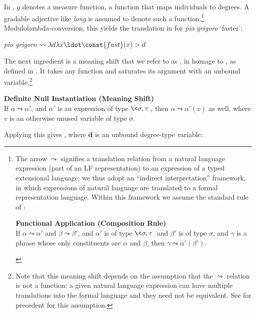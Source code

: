 \documentclass[output=paper
,modfonts
,nonflat]{langsci/langscibook}
\begin{document}
In , $g$ denotes a measure function, a function that maps individuals to degrees. A gradable adjective like \textit{long} is assumed to denote such a function.\footnote{The arrow $\leadsto$ signifies a translation relation from a natural language expression (part of an LF representation) to an expression of a typed extensional language; we thus adopt an ``indirect interpretation'' framework, in which expressions of natural language are translated to a formal representation language. Within this framework we assume the standard rule of :

\begin{exe}
	 \textbf{Functional Application (Composition Rule)}\\
	If $\alpha \leadsto \alpha'$  and $\beta \leadsto \beta'$, and $\alpha'$ is of type $\<\sigma,\tau\>$ and $\beta'$ is of type $\sigma$, and $\gamma$ is a phrase whose only constituents are $\alpha$ and $\beta$, then $\gamma \leadsto \alpha'(\beta')$.
\end{exe}\vspace*{-\baselineskip}
}
Modulo\largerpage lambda-conversion, this yields the translation in  for \textit{pio grigoro} `faster':

\ea \label{ex:coppockstrand:79} \textit{pio grigoro}  $\leadsto \lambda d \lambda x \ldot \const{fast}(x) > d$\label{longer}
\z 

The next ingredient is a meaning shift that we refer to as , in homage to \citet{Fillmore1986}, as defined in . It takes any function and saturates its argument with an unbound variable.\footnote{Note that this meaning shift depends on the assumption that the $\leadsto$ relation is not a function; a given natural language expression can have multiple translations into the formal language and they need not be equivalent. See \citet{ParteeRooth1983} for precedent for this assumption.}

\ea \label{ex:coppockstrand:80}
\textbf{Definite Null Instantiation (Meaning Shift)}\\
If $\alpha \leadsto \alpha'$, and $\alpha'$ is an expression of type $\<\sigma,\tau\>$, then $\alpha \leadsto \alpha'(v)$ as well, where $v$ is an otherwise unused variable of type $\sigma$.
\z 

Applying this gives , where $\textbf{d}$ is an unbound degree-type variable:
\end{document}
